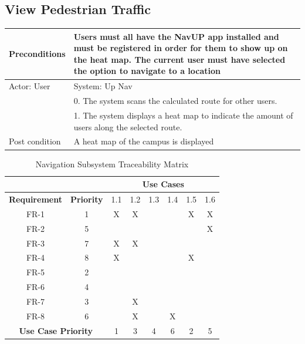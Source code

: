\documentclass{article}
\begin{document}
\begin{enumerate}
	\subsection{View Pedestrian Traffic}
	\begin{tabular}{ | m{15em} | m{15em}| }
		\hline
		Preconditions													& Users must all have the NavUP app installed and must be registered in order for them to show up on the heat map. The current user must have selected the option to navigate to a location \\
		\hline
		Actor: User														& System: Up Nav \\
		\hline
																	& 0. The system scans the calculated route for other users. \\
		\hline
																	& 1. The system displays a heat map to indicate the amount of users along the selected route. \\
		\hline
		Post condition													& A heat map of the campus is displayed \\
		\hline

	\end{tabular}

	
	\begin{table}[h!]
\centering
\caption{Navigation Subsystem Traceability Matrix}
\label{my-label}
\begin{tabular}{cc|c|c|c|c|c|c|}
\cline{3-8}
                                           &                   & \multicolumn{6}{c|}{\textbf{Use Cases}} \\ \hline
\multicolumn{1}{|c|}{\textbf{Requirement}} & \textbf{Priority} & 1.1  & 1.2  & 1.3  & 1.4  & 1.5  & 1.6  \\ \hline
\multicolumn{1}{|c|}{FR-1}                 & 1                 & X    & X    &      &      & X    & X    \\ \hline
\multicolumn{1}{|c|}{FR-2}                 & 5                 &      &      &      &      &      & X    \\ \hline
\multicolumn{1}{|c|}{FR-3}                 & 7                 & X    & X    &      &      &      &      \\ \hline
\multicolumn{1}{|c|}{FR-4}                 & 8                 & X    &      &      &      & X    &      \\ \hline
\multicolumn{1}{|c|}{FR-5}                 & 2                 &      &      &      &      &      &      \\ \hline
\multicolumn{1}{|c|}{FR-6}                 & 4                 &      &      &      &      &      &      \\ \hline
\multicolumn{1}{|c|}{FR-7}                 & 3                 &      & X    &      &      &      &      \\ \hline
\multicolumn{1}{|c|}{FR-8}                 & 6                 &      & X    &      & X    &      &      \\ \hline
\multicolumn{2}{|c|}{\textbf{Use Case Priority}}               & 1    & 3    & 4    & 6    & 2    & 5    \\ \hline
\end{tabular}
\end{table}




\end{enumerate}
\end{document}
